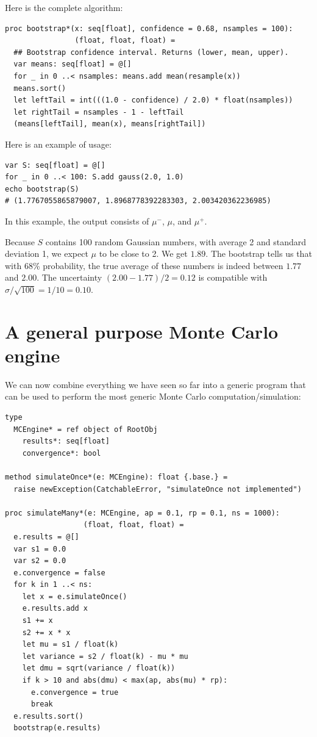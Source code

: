 \documentclass[justified, sixbynine]{tufte-book}
\def\ft{\small\tt}
\theoremstyle{plain}%
\newtheorem * {corollary}{Corollary}
\theoremstyle{definition}
\theoremstyle{remark}
\newtheorem * {remark}{Remark}
\newtheorem * {note}{Note}
\begin{document}
\begin{fullwidth}
Here is the complete algorithm:

\begin{lstlisting}[caption={in file: {\ft nlib.nim}}]
proc bootstrap*(x: seq[float], confidence = 0.68, nsamples = 100):
                (float, float, float) =
  ## Bootstrap confidence interval. Returns (lower, mean, upper).
  var means: seq[float] = @[]
  for _ in 0 ..< nsamples: means.add mean(resample(x))
  means.sort()
  let leftTail = int(((1.0 - confidence) / 2.0) * float(nsamples))
  let rightTail = nsamples - 1 - leftTail
  (means[leftTail], mean(x), means[rightTail])
\end{lstlisting}

Here is an example of usage:

\begin{lstlisting}
var S: seq[float] = @[]
for _ in 0 ..< 100: S.add gauss(2.0, 1.0)
echo bootstrap(S)
# (1.7767055865879007, 1.8968778392283303, 2.003420362236985)
\end{lstlisting}

In this example, the output consists of $\mu^-$, $\mu$, and $\mu^+$.

Because $S$ contains 100 random Gaussian numbers, with average 2 and standard deviation 1, we expect $\mu$ to be close to 2. We get $1.89$. The bootstrap tells us that with 68\% probability, the true average of these numbers is indeed between $1.77$ and $2.00$. The uncertainty $(2.00-1.77)/2 = 0.12$ is compatible with $\sigma/\sqrt{100} = 1/10 = 0.10$.

\goodbreak\section{A general purpose Monte Carlo engine}

We can now combine everything we have seen so far into a generic program that can be used to perform the most generic Monte Carlo computation/simulation:


\begin{lstlisting}[caption={in file: {\ft nlib.nim}}]
type
  MCEngine* = ref object of RootObj
    results*: seq[float]
    convergence*: bool

method simulateOnce*(e: MCEngine): float {.base.} =
  raise newException(CatchableError, "simulateOnce not implemented")

proc simulateMany*(e: MCEngine, ap = 0.1, rp = 0.1, ns = 1000):
                  (float, float, float) =
  e.results = @[]
  var s1 = 0.0
  var s2 = 0.0
  e.convergence = false
  for k in 1 ..< ns:
    let x = e.simulateOnce()
    e.results.add x
    s1 += x
    s2 += x * x
    let mu = s1 / float(k)
    let variance = s2 / float(k) - mu * mu
    let dmu = sqrt(variance / float(k))
    if k > 10 and abs(dmu) < max(ap, abs(mu) * rp):
      e.convergence = true
      break
  e.results.sort()
  bootstrap(e.results)
\end{lstlisting}


\end{fullwidth}
\end{document}
